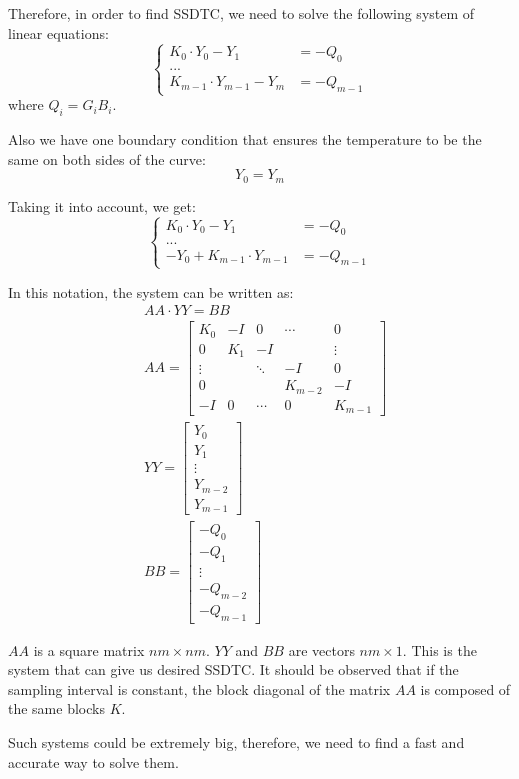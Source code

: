 Therefore, in order to find SSDTC, we need to solve the following system of linear equations:
\[
  \begin{cases}
    K_0 \cdot Y_0 - Y_1 & = -Q_0 \\
    ... \\
    K_{m-1} \cdot Y_{m-1} - Y_{m} & = -Q_{m-1}
  \end{cases}
\]
where $Q_i = G_i B_i$.

Also we have one boundary condition that ensures the temperature to be the same on both sides of the curve:
\begin{equation} \label{eq:boundary-condition}
  Y_0 = Y_m
\end{equation}

Taking it into account, we get:
\[
  \begin{cases}
    K_0 \cdot Y_0 - Y_1 & =-Q_0 \\
    ... \\
    -Y_0 + K_{m-1} \cdot Y_{m-1} & = -Q_{m-1}
  \end{cases}
\]

In this notation, the system can be written as:
\begin{align}
  & AA \cdot YY = BB \label{eq:system} \\
  & AA = \left[
    \begin{array}{ccccc}
      K_0 & -I & 0 & \cdots & 0 \\
      0 & K_1 & -I &  & \vdots \\
      \vdots &  & \ddots & -I & 0 \\
      0 &  &  & K_{m-2} & -I \\
      -I & 0 & \cdots & 0 & K_{m-1}
    \end{array}
  \right] \nonumber \\
  & YY = \left[
    \begin{array}{c}
      Y_0 \\
      Y_1 \\
      \vdots \\
      Y_{m-2} \\
      Y_{m-1}
    \end{array}
  \right] \nonumber \\
  & BB = \left[
    \begin{array}{c}
      -Q_0 \\
      -Q_1 \\
      \vdots \\
      -Q_{m-2} \\
      -Q_{m-1}
    \end{array}
  \right] \nonumber
\end{align}

$AA$ is a square matrix $nm \times nm$. $YY$ and $BB$ are vectors $nm \times 1$. This is the system that can give us desired SSDTC. It should be observed that if the sampling interval is constant, the block diagonal of the matrix $AA$ is composed of the same blocks $K$.

Such systems could be extremely big, therefore, we need to find a fast and accurate way to solve them.
